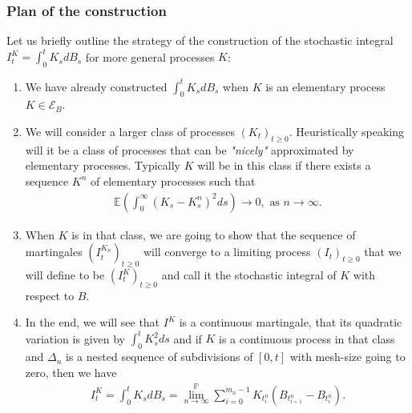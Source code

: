 \documentclass[../mainfile.tex]{subfiles}
\begin{document}
\subsubsection{Plan of the construction}
Let us briefly outline the strategy of the construction of the stochastic integral $I_t^K = \int_0^t K_sdB_s$ for more general processes $K$: 
\begin{enumerate}
\item We have already constructed $\int_0^t K_s dB_s$ when $K$ is an elementary process $K \in \mathcal{E}_B$. 
\item We will consider a larger class of processes $(K_t)_{t \geq 0}$. Heuristically speaking will it be a class of processes that can be \textit{"nicely"} approximated by elementary processes. Typically $K$ will be in this class if there exists a sequence $K^n$ of elementary processes such that 
\begin{align*}
\mathbb{E} \left( \int_0^\infty (K_s-K_s^n)^2ds \right) \to 0, \text{ as } n \to \infty. 
\end{align*}
\item When $K$ is in that class, we are going to show that the sequence of martingales $(I_t^{K_n})_{t \geq 0}$ will converge to a limiting process $(I_t)_{t \geq 0}$ that we will define to be $(I_t^K)_{t \geq 0}$ and call it the stochastic integral of $K$ with respect to $B$. 
\item In the end, we will see that $I^K$ is a continuous martingale, that its quadratic variation is given by $\int_0^t K_s^2 ds$ and if $K$ is a continuous process in that class and $\Delta_n$ is a nested sequence of subdivisions of $[0,t]$ with mesh-size going to zero, then we have 
\begin{align*}
I_t^K = \int_0^t K_s dB_s = \lim_{n \to \infty}^\mathbb{P} \sum_{i=0}^{m_n-1} K_{t_i^n} (B_{t_{i+1}^n}- B_{t_i^n}). 
\end{align*}
\end{enumerate}
\end{document}
